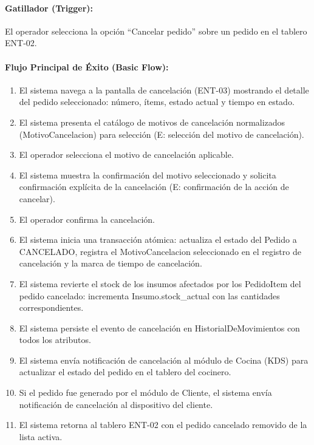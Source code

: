 \paragraph{Gatillador (Trigger):} El operador selecciona la opción ``Cancelar pedido'' sobre un pedido en el tablero ENT-02.

\paragraph{Flujo Principal de Éxito (Basic Flow):}
\begin{enumerate}
    \item[I.] El sistema navega a la pantalla de cancelación (ENT-03) mostrando el detalle del pedido seleccionado: número, ítems, estado actual y tiempo en estado.
    \item[II.] El sistema presenta el catálogo de motivos de cancelación normalizados (MotivoCancelacion) para selección (E: selección del motivo de cancelación).
    \item[III.] El operador selecciona el motivo de cancelación aplicable.
    \item[IV.] El sistema muestra la confirmación del motivo seleccionado y solicita confirmación explícita de la cancelación (E: confirmación de la acción de cancelar).
    \item[V.] El operador confirma la cancelación.
    \item[VI.] El sistema inicia una transacción atómica: actualiza el estado del Pedido a CANCELADO, registra el MotivoCancelacion seleccionado en el registro de cancelación y la marca de tiempo de cancelación.
    \item[VII.] El sistema revierte el stock de los insumos afectados por los PedidoItem del pedido cancelado: incrementa Insumo.stock\_actual con las cantidades correspondientes.
    \item[VIII.] El sistema persiste el evento de cancelación en HistorialDeMovimientos con todos los atributos.
    \item[IX.] El sistema envía notificación de cancelación al módulo de Cocina (KDS) para actualizar el estado del pedido en el tablero del cocinero.
    \item[X.] Si el pedido fue generado por el módulo de Cliente, el sistema envía notificación de cancelación al dispositivo del cliente.
    \item[XI.] El sistema retorna al tablero ENT-02 con el pedido cancelado removido de la lista activa.
\end{enumerate}

